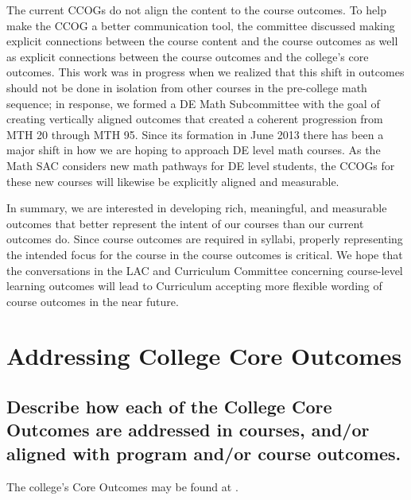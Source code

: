 The current CCOGs do not align the content to the course outcomes.
To help make the CCOG a better communication tool, the committee discussed making explicit connections between the course content and the course outcomes as well as explicit connections between the course outcomes and the college's core outcomes.
This work was in progress when we realized that this shift in outcomes should not be done in isolation from other courses in the pre-college math sequence; in response, we formed a DE Math Subcommittee with the goal of creating vertically aligned outcomes that created a coherent progression from MTH 20 through MTH 95.
Since its formation in June 2013 there has been a major shift in how we are hoping to approach DE level math courses.
As the Math SAC considers new math pathways for DE level students, the CCOGs for these new courses will likewise be explicitly aligned and measurable.

In summary, we are interested in developing rich, meaningful, and measurable outcomes that better represent the intent of our courses than our current outcomes do.
Since course outcomes are required in syllabi, properly representing the intended focus for the course in the course outcomes is critical.
We hope that the conversations in the LAC and Curriculum Committee concerning course-level learning outcomes will lead to Curriculum accepting more flexible wording of course outcomes in the near future.


\section{Addressing College Core Outcomes}

\subsection[Outcomes in courses and the math program]{Describe how each of the
	College Core Outcomes are addressed in courses, and/or aligned with program
	and/or course outcomes.}

The college's Core Outcomes may be found at \cite{coreoutcomes}.

